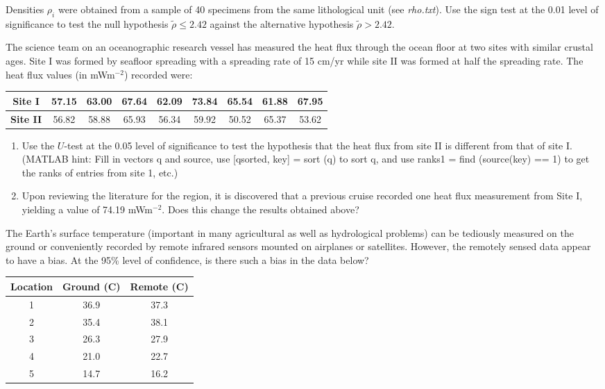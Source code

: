\begin{problem}
Densities $\rho_i$ were obtained from a sample of 40 specimens from the
same lithological unit (see \emph{rho.txt}).
Use the sign test at the 0.01 level of significance to test the null hypothesis $\tilde{\rho} \leq 2.42$
against the alternative hypothesis $\tilde{\rho} > 2.42$.
\end{problem}

\begin{problem}
The science team on an oceanographic research vessel has measured the heat flux through
the ocean floor at two sites with similar crustal ages.  Site I was formed by seafloor spreading
with a spreading rate of 15 cm/yr while site II was formed at half the spreading rate.  The
heat flux values (in mWm$^{-2}$) recorded were:
\begin{table}[H]
\centering
\begin{tabular}{|c||c|c|c|c|c|c|c|c|} \hline
\bf{Site I} & 57.15 &  63.00 & 67.64 & 62.09 & 73.84 & 65.54 & 61.88 & 67.95 \\ \hline
\bf{Site II} & 56.82 & 58.88 & 65.93 & 56.34 & 59.92 & 50.52 & 65.37 & 53.62 \\ \hline
\end{tabular}
\end{table}
\begin{enumerate}[label=\alph*)]
\item Use the $U$-test at the 0.05 level of significance to test the hypothesis that the heat flux
from site II is different from that of site I. (MATLAB hint: Fill in vectors q and source, use [qsorted, key] = sort (q)
to sort q, and use ranks1 = find (source(key) == 1) to get the ranks of entries from site 1, etc.)
\item Upon reviewing the literature for the region, it is discovered that a previous cruise recorded
one heat flux measurement from Site I, yielding a value of 74.19 mWm$^{-2}$.  Does this change the results
obtained above?
\end{enumerate}
\end{problem}

\begin{problem}
The Earth's surface temperature (important in many agricultural as well as hydrological problems)
can be tediously measured on the ground or conveniently recorded by remote infrared sensors mounted on
airplanes or satellites.  However, the remotely sensed data appear to have a bias.  At the 95\%
level of confidence, is there such a bias in the data below?
\begin{table}[H]
\centering
\begin{tabular}{|c||c|c|} \hline
\bf{Location}	&	\bf{Ground (\DS C)}	&	\bf{Remote (\DS C)} \\ \hline
1	&	36.9	&	37.3 \\ \hline
2	&	35.4	&	38.1 \\ \hline
3	&	26.3	&	27.9 \\ \hline
4	&	21.0	&	22.7 \\ \hline
5	&	14.7	&	16.2 \\ \hline
\end{tabular}
\end{table}
\end{problem}

